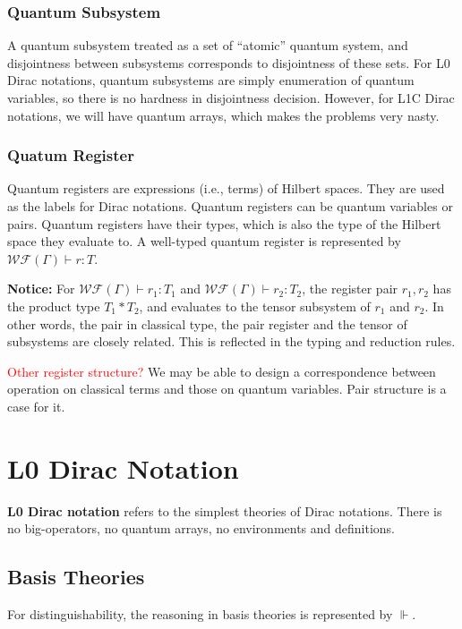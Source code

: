 \subsubsection*{Quantum Subsystem}
A quantum subsystem treated as a set of ``atomic'' quantum system, and disjointness between subsystems corresponds to disjointness of these sets. For L0 Dirac notations, quantum subsystems are simply enumeration of quantum variables, so there is no hardness in disjointness decision. However, for L1C Dirac notations, we will have quantum arrays, which makes the problems very nasty.

\subsubsection*{Quatum Register}
Quantum registers are expressions (i.e., terms) of Hilbert spaces. They are used as the labels for Dirac notations. Quantum registers can be quantum variables or pairs. Quantum registers have their types, which is also the type of the Hilbert space they evaluate to. A well-typed quantum register is represented by $\mathcal{WF}(\Gamma) \vdash r : T$.

\textbf{Notice:} For $\mathcal{WF}(\Gamma) \vdash r_1 : T_1$ and $\mathcal{WF}(\Gamma) \vdash r_2 : T_2$, the register pair $r_1, r_2$ has the product type $T_1 * T_2$, and evaluates to the tensor subsystem of $r_1$ and $r_2$. In other words, the pair in classical type, the pair register and the tensor of subsystems are closely related. This is reflected in the typing and reduction rules.

\textcolor{red}{Other register structure?}
We may be able to design a correspondence between operation on classical terms and those on quantum variables. Pair structure is a case for it.


\section{L0 Dirac Notation}

\textbf{L0 Dirac notation} refers to the simplest theories of Dirac notations. There is no big-operators, no quantum arrays, no environments and definitions.

\subsection{Basis Theories}
For distinguishability, the reasoning in basis theories is represented by $\Vdash$.

